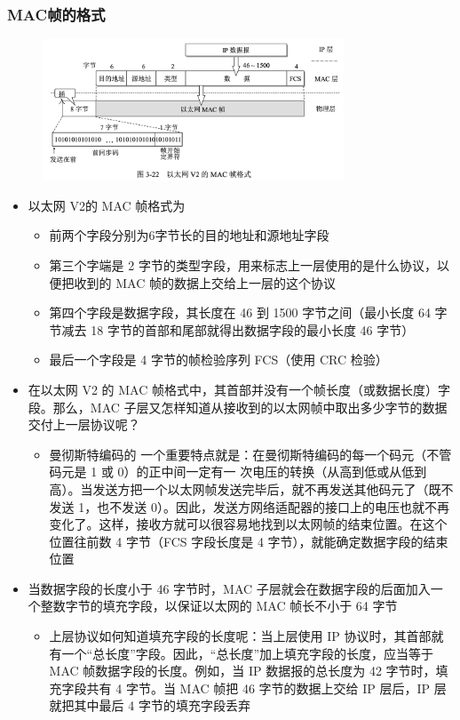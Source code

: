 \documentclass[cs4size,a4paper,10pt]{ctexart}
\begin{document}
	\subsubsection{MAC帧的格式}

	\begin{figure}[H]
		\centering
		\includegraphics[width=0.8\textwidth]{img/3.22}
	\end{figure}

	\begin{itemize}
		\item 以太网 V2的 MAC 帧格式为
		\begin{itemize}
			\item 前两个字段分别为6字节长的目的地址和源地址字段
			\item 第三个字端是 2 字节的类型字段，用来标志上一层使用的是什么协议，以便把收到的 MAC 帧的数据上交给上一层的这个协议
			\item 第四个字段是数据字段，其长度在 46 到 1500 字节之间（最小长度 64 字节减去 18 字节的首部和尾部就得出数据字段的最小长度 46 字节）
			\item 最后一个字段是 4 字节的帧检验序列 FCS（使用 CRC 检验）
		\end{itemize}
		\item 在以太网 V2 的 MAC 帧格式中，其首部并没有一个帧长度（或数据长度）字段。那么，MAC 子层又怎样知道从接收到的以太网帧中取出多少字节的数据交付上一层协议呢？
		\begin{itemize}
			\item 曼彻斯特编码的 一个重要特点就是：在曼彻斯特编码的每一个码元（不管码元是 1 或 0）的正中间一定有一 次电压的转换（从高到低或从低到高）。当发送方把一个以太网帧发送完毕后，就不再发送其他码元了（既不发送 1，也不发送 0）。因此，发送方网络适配器的接口上的电压也就不再变化了。这样，接收方就可以很容易地找到以太网帧的结束位置。在这个位置往前数 4 字节（FCS 字段长度是 4 字节），就能确定数据字段的结束位置
		\end{itemize}
		\item 当数据字段的长度小于 46 字节时，MAC 子层就会在数据字段的后面加入一个整数字节的填充字段，以保证以太网的 MAC 帧长不小于 64 字节
		\begin{itemize}
			\item 上层协议如何知道填充字段的长度呢：当上层使用 IP 协议时，其首部就有一个“总长度”字段。因此，“总长度”加上填充字段的长度，应当等于 MAC 帧数据字段的长度。例如，当 IP 数据报的总长度为 42 字节时，填充字段共有 4 字节。当 MAC 帧把 46 字节的数据上交给 IP 层后，IP 层就把其中最后 4 字节的填充字段丢弃
		\end{itemize}
	\end{itemize}
\end{document}
